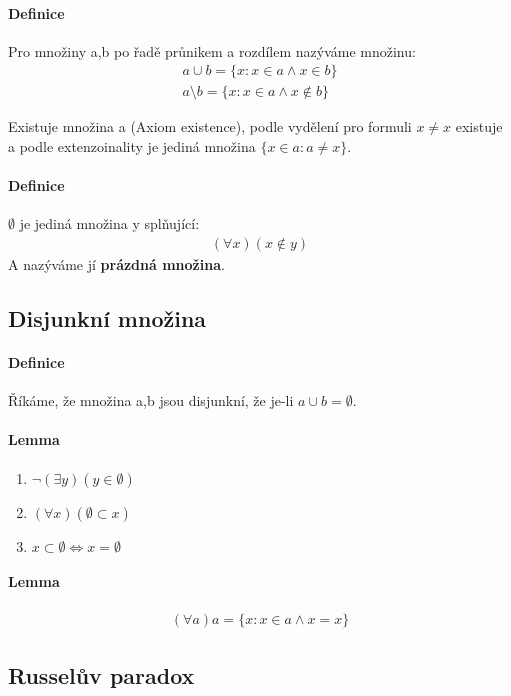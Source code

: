 \documentclass[a4paper,12pt,titlepage]{article}
\begin{document}
\paragraph{Definice}
Pro množiny a,b po řadě průnikem a rozdílem nazýváme množinu:
\begin{align}
	a \cup b = \{ x : x \in a \land x \in b \} \\
	a \setminus b = \{ x : x \in a \land x \nin b \}
\end{align}

Existuje množina a (Axiom existence), podle vydělení pro formuli $x \neq x$
existuje a podle extenzoinality je jediná množina $\{ x \in a : a \neq x \}$.


\paragraph{Definice}
$\emptyset$ je jediná množina y splňující:
\begin{align}
	(\forall x) (x \nin y)
\end{align}
A nazýváme jí \textbf{prázdná množina}.

\subsection{Disjunkní množina}
\setcounter{equation}{0}
\paragraph{Definice}
Říkáme, že množina a,b jsou disjunkní, že  je-li $a \cup b = \emptyset$.

\paragraph{Lemma}
\begin{enumerate}
	\item $\neg (\exists y)(y \in \emptyset)$
	\item $(\forall x) (\emptyset \subset x)$
	\item $x \subset \emptyset \Leftrightarrow x = \emptyset$
\end{enumerate}
\paragraph{Lemma}
\begin{align}
	(\forall a) a = \{ x : x \in a \land x = x \}
\end{align}


\subsection{Russelův paradox}
\setcounter{equation}{0}
\end{document}
